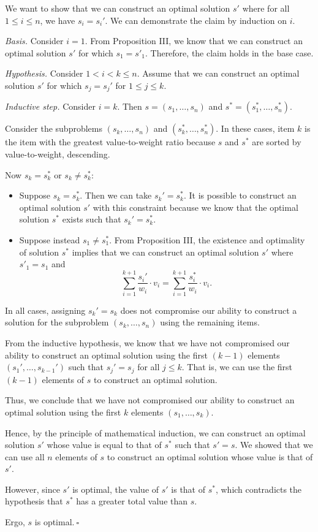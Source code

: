 \begin{enumerate}
\begin{solution}
We want to show that we can construct an optimal solution $s'$ where
for all $1\leq i\leq n$, we have $s_i=s_i'$. We can demonstrate the claim by induction on $i$.

\textit{Basis. }Consider $i=1$. From Proposition III, we know that we can construct an optimal solution $s'$ for which $s_1=s'_1$. Therefore, the claim holds in the base case.

\textit{Hypothesis. }Consider $1<i<k\leq n$. Assume that we can construct an optimal solution $s'$ for which $s_j=s_j'$ for $1\leq j\leq k$.

\textit{Inductive step. }Consider $i=k$. Then $s=(s_1,\dots,s_n)$ and $s^*=(s_1^*,\dots,s_n^*)$. 

Consider the subproblems $(s_k,\dots,s_n)$ and $(s_k^*,\dots,s_n^*)$. In these cases, item $k$ is the item with the greatest value-to-weight ratio because $s$ and $s^*$ are sorted by value-to-weight, descending.

Now $s_k=s_k^*$ or $s_k\neq s_k^*$:
\begin{itemize}
    \item Suppose $s_k=s_k^*$. Then we can take $s_k'=s_k^*$. It is possible to construct an optimal solution $s'$ with this constraint because we know that the optimal solution $s^*$ exists such that $s_k'=s_k^*$. 
     \item Suppose instead $s_1\neq s_1^*$. 
     From Proposition III, the existence and optimality of solution $s^*$ implies that we can construct an optimal solution $s'$ where $s'_1=s_1$ and \[\sum_{i=1}^{k+1}\frac{s_i'}{w_i}\cdot v_i=\sum_{i=1}^{k+1}\frac{s_i^*}{w_i}\cdot v_i.\] 
\end{itemize}
In all cases, assigning $s_k'=s_k$ does not compromise our ability to construct a solution for the subproblem $(s_k,\dots,s_n)$ using the remaining items.

From the inductive hypothesis, we know that we have not compromised our ability to construct an optimal solution using the first $(k-1)$ elements $(s_1',\dots,s_{k-1}')$ such that $s_j'=s_j$ for all $j\leq k$. That is, we can use the first $(k-1)$ elements of $s$ to construct an optimal solution.

Thus, we conclude that we have not compromised our ability to construct an optimal solution using the first $k$ elements $(s_1,\dots,s_k)$.

Hence, by the principle of mathematical induction, we can construct an optimal solution $s'$ whose value is equal to that of $s^*$ such that $s'=s$. We showed that we can use all $n$ elements of $s$ to construct an optimal solution whose value is that of $s'$. 

However, since $s'$ is optimal, the value of $s'$ is that of $s^*$, which contradicts the hypothesis that $s^*$ has a greater total value than $s$.

Ergo, $s$ is optimal.$~\square$
\end{solution}
\end{enumerate}
\newpage
